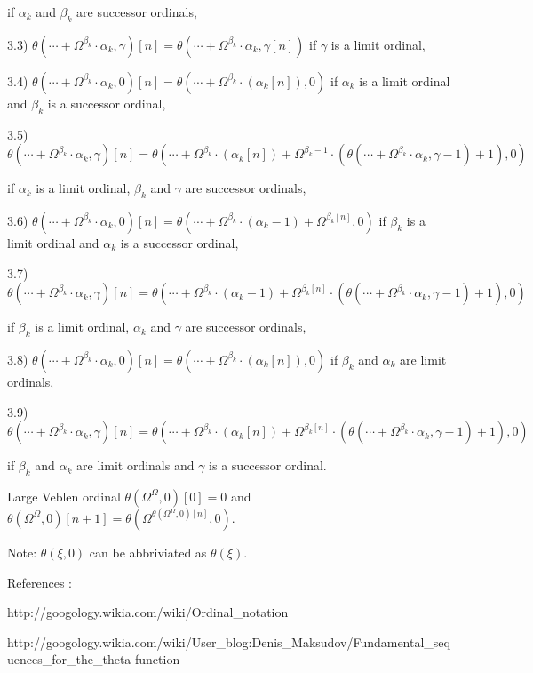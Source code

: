 \documentclass[10pt]{article}
\begin{document}
if \(\alpha_k\) and \(\beta_k\) are successor ordinals,

3.3) \(\theta(\cdots+\Omega^{\beta_k}\cdot\alpha_k,\gamma)[n]=\theta(\cdots+\Omega^{\beta_k}\cdot\alpha_k,\gamma[n])\) if \(\gamma\) is a limit ordinal,

3.4) \(\theta(\cdots+\Omega^{\beta_k}\cdot\alpha_k,0)[n]=\theta(\cdots+\Omega^{\beta_k}\cdot(\alpha_k[n]),0)\) if \(\alpha_k\) is a limit ordinal and \(\beta_k\) is a successor ordinal,

3.5) \(\theta(\cdots+\Omega^{\beta_k}\cdot\alpha_k,\gamma)[n]=\theta(\cdots+\Omega^{\beta_k}\cdot(\alpha_k[n])+\Omega^{\beta_k-1}\cdot(\theta(\cdots+\Omega^{\beta_k}\cdot\alpha_k,\gamma-1)+1),0)\)

if \(\alpha_k\) is a limit ordinal, \(\beta_k\) and \(\gamma\) are successor ordinals,

3.6) \(\theta(\cdots+\Omega^{\beta_k}\cdot\alpha_k,0)[n]=\theta(\cdots+\Omega^{\beta_k}\cdot(\alpha_k-1)+\Omega^{\beta_k[n]},0)\) if \(\beta_k\) is a limit ordinal and \(\alpha_k\) is a successor ordinal,

3.7) \(\theta(\cdots+\Omega^{\beta_k}\cdot\alpha_k,\gamma)[n]=\theta(\cdots+\Omega^{\beta_k}\cdot(\alpha_k-1)+\Omega^{\beta_k[n]}\cdot(\theta(\cdots+\Omega^{\beta_k}\cdot\alpha_k,\gamma-1)+1),0)\)

if \(\beta_k\) is a limit ordinal, \(\alpha_k\) and \(\gamma\) are successor ordinals,

3.8) \(\theta(\cdots+\Omega^{\beta_k}\cdot\alpha_k,0)[n]=\theta(\cdots+\Omega^{\beta_k}\cdot(\alpha_k[n]),0)\) if \(\beta_k\) and \(\alpha_k\) are limit ordinals,

3.9) \(\theta(\cdots+\Omega^{\beta_k}\cdot\alpha_k,\gamma)[n]=\theta(\cdots+\Omega^{\beta_k}\cdot(\alpha_k[n])+\Omega^{\beta_k[n]}\cdot(\theta(\cdots+\Omega^{\beta_k}\cdot\alpha_k,\gamma-1)+1),0)\)

if \(\beta_k\) and \(\alpha_k\) are limit ordinals and \(\gamma\) is a successor ordinal.

Large Veblen ordinal \(\theta(\Omega^\Omega,0)[0]=0\) and \(\theta(\Omega^\Omega,0)[n+1]=\theta(\Omega^{\theta(\Omega^\Omega,0)[n]},0)\).

Note: \(\theta(\xi,0)\) can be abbriviated as \(\theta(\xi)\).

\bigskip

References :

http://googology.wikia.com/wiki/Ordinal\_notation

http://googology.wikia.com/wiki/User\_blog:Denis\_Maksudov/Fundamental\_sequences\_for\_the\_theta-function
\end{document}

